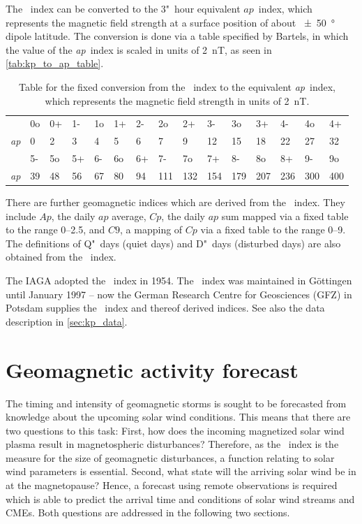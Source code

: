 The \Kp{}~index can be converted to the 3"~hour equivalent $ap$~index, which represents the magnetic field strength at a surface position of about \SI{+-50}{\degree} dipole latitude. The conversion is done via a table specified by Bartels, in which the value of the \textit{ap}~index is scaled in units of \SI{2}{nT}, as seen in \autoref{tab:kp_to_ap_table}.
\begin{table}
	\caption{Table for the fixed conversion from the \Kp~index to the equivalent \textit{ap}~index, which represents the magnetic field strength in units of \SI{2}{nT}.}
	\label{tab:kp_to_ap_table}
	\centering
	\begin{tabular}{lssssssssssssss}
		\Kp	&0o	&0+	&1-	&1o	&1+	&2-	&2o	&2+	&3-	&3o	&3+	&4-	&4o	&4+\\
		\textit{ap}	&0	&2	&3	&4	&5	&6	&7	&9	&12	&15	&18	&22	&27	&32\\
		\hline
		\Kp	&5-	&5o	&5+	&6-	&6o	&6+	&7-	&7o	&7+	&8-	&8o	&8+	&9-	&9o\\
		\textit{ap}	&39	&48	&56	&67	&80	&94	&111	&132	&154	&179	&207	&236	&300	&400
	\end{tabular}
\end{table}
There are further geomagnetic indices which are derived from the \Kp{}~index. They include $Ap$, the daily $ap$ average, $Cp$, the daily $ap$ sum mapped via a fixed table to the range \numrange{0}{2.5}, and $C9$, a mapping of $Cp$ via a fixed table to the range \numrange{0}{9}. The definitions of Q"~days (quiet days) and D"~days (disturbed days) are also obtained from the \Kp{}~index.

The IAGA adopted the \Kp{}~index in 1954. The \Kp{}~index was maintained in Göttingen until January 1997 -- now the German Research Centre for Geosciences (GFZ) in Potsdam supplies the \Kp{}~index and thereof derived indices. See also the \Kp{} data description in \autoref{sec:kp_data}.


\section{Geomagnetic activity forecast}
\label{sec:geomagnetic_activity_forecast}
The timing and intensity of geomagnetic storms is sought to be forecasted from knowledge about the upcoming solar wind conditions. This means that there are two questions to this task: First, how does the incoming magnetized solar wind plasma result in magnetospheric disturbances? Therefore, as the \Kp~index is the measure for the size of geomagnetic disturbances, a function relating \Kp{} to solar wind parameters is essential. Second, what state will the arriving solar wind be in at the magnetopause? Hence, a forecast using remote observations is required which is able to predict the arrival time and conditions of solar wind streams and CMEs. Both questions are addressed in the following two sections.


